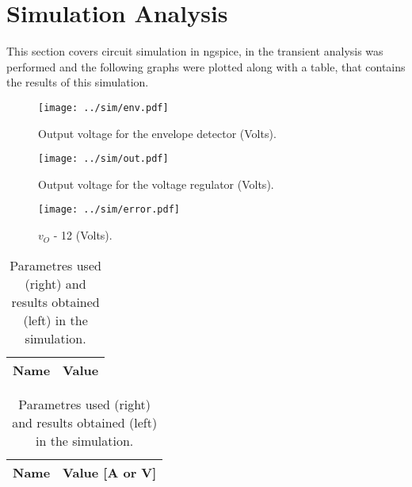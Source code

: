 \newpage
\section{Simulation Analysis}
\label{sec:simulation}
This section covers circuit simulation in ngspice, in the transient analysis was performed and the following graphs were plotted along with a table, 
that contains the results of this simulation.
\newpage
\begin{figure}[h!] \centering
\texttt{[image: ../sim/env.pdf]}
\caption{Output voltage for the envelope detector (Volts).}
\label{fig:envelope}
\end{figure}

\begin{figure}[h!] \centering
\texttt{[image: ../sim/out.pdf]}
\caption{Output voltage for the voltage regulator (Volts).}
\label{fig:regulator}
\end{figure}

\begin{figure}[h!] \centering
\texttt{[image: ../sim/error.pdf]}
\caption{$v_O$ - 12 (Volts).}
\label{fig: vo - 12}
\end{figure}

\begin{table}[h!]
  \centering
  \begin{tabular}{|c|c|}
    \hline    
    {\bf Name} & {\bf Value} \\ \hline
    
  \end{tabular}
 \begin{tabular}{|c|c|}
 \hline
 \centering
    {\bf Name} & {\bf Value [A or V]} \\ 
    \hline
    
\hline
 \end{tabular}
 \caption{Parametres used (right) and results obtained (left) in the simulation.}
  \label{tab:optabs}
\end{table}





